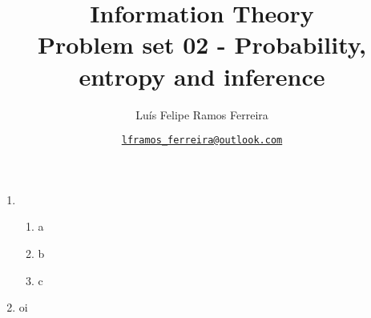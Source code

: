 \documentclass{article}
\title{Information Theory \\ \large Problem set 02 - Probability, entropy and inference}
\author{Luís Felipe Ramos Ferreira}
\date{\href{mailto:lframos\_ferreira@outlook.com}{\texttt{lframos\_ferreira@outlook.com}}
}
\begin{document}
\maketitle

\begin{enumerate}
  \item \begin{enumerate}
      \item a
      \item b
      \item c
  \end{enumerate}

\item oi
\end{enumerate}
\end{document}
